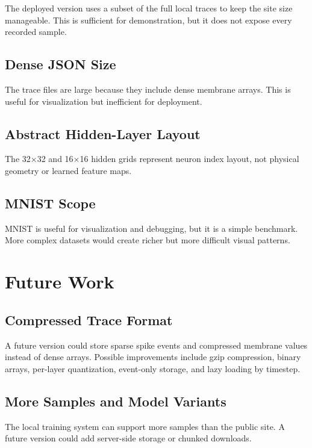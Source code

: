 \documentclass[11pt,a4paper]{article}
\begin{document}
The deployed version uses a subset of the full local traces to keep the site size manageable. This is sufficient for demonstration, but it does not expose every recorded sample.

\subsection{Dense JSON Size}

The trace files are large because they include dense membrane arrays. This is useful for visualization but inefficient for deployment.

\subsection{Abstract Hidden-Layer Layout}

The 32$\times$32 and 16$\times$16 hidden grids represent neuron index layout, not physical geometry or learned feature maps.

\subsection{MNIST Scope}

MNIST is useful for visualization and debugging, but it is a simple benchmark. More complex datasets would create richer but more difficult visual patterns.

\section{Future Work}

\subsection{Compressed Trace Format}

A future version could store sparse spike events and compressed membrane values instead of dense arrays. Possible improvements include gzip compression, binary arrays, per-layer quantization, event-only storage, and lazy loading by timestep.

\subsection{More Samples and Model Variants}

The local training system can support more samples than the public site. A future version could add server-side storage or chunked downloads.
\end{document}
